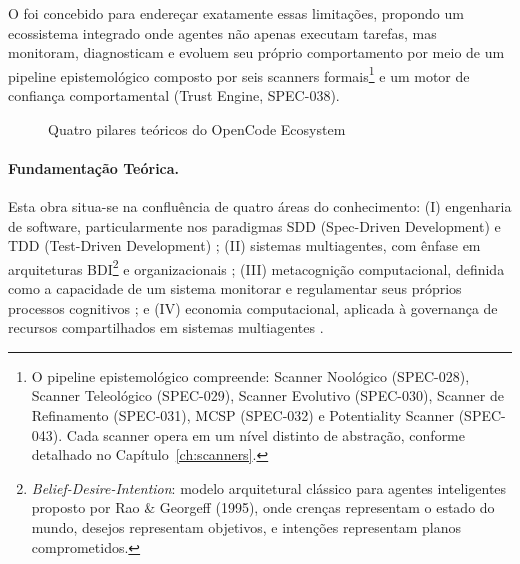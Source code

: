 O \opencodeeco{} foi concebido para endereçar exatamente essas limitações,
propondo um ecossistema integrado onde agentes não apenas executam
tarefas, mas monitoram, diagnosticam e evoluem seu próprio comportamento
por meio de um pipeline epistemológico composto por seis scanners
formais\footnote{O pipeline epistemológico compreende: Scanner Noológico
(SPEC-028), Scanner Teleológico (SPEC-029), Scanner Evolutivo (SPEC-030),
Scanner de Refinamento (SPEC-031), MCSP (SPEC-032) e Potentiality Scanner
(SPEC-043). Cada scanner opera em um nível distinto de abstração,
conforme detalhado no Capítulo~\ref{ch:scanners}.} e um motor de confiança
comportamental (Trust Engine, SPEC-038).

\begin{figure}[htb]
\centering
\caption{Quatro pilares teóricos do OpenCode Ecosystem}
\label{fig:quatro-pilares}
\end{figure}

\paragraph*{Fundamentação Teórica.}
Esta obra situa-se na confluência de quatro áreas do conhecimento:
(I) engenharia de software, particularmente nos paradigmas SDD
(Spec-Driven Development) e TDD (Test-Driven Development)
\cite{beck2003tdd}; (II) sistemas multiagentes, com ênfase em
arquiteturas BDI\footnote{\textit{Belief-Desire-Intention}: modelo
arquitetural clássico para agentes inteligentes proposto por
Rao \& Georgeff (1995), onde crenças representam o estado do mundo,
desejos representam objetivos, e intenções representam planos
comprometidos.} e organizacionais \cite{ferber1999multiagent};
(III) metacognição computacional, definida como a capacidade de um
sistema monitorar e regulamentar seus próprios processos cognitivos
\cite{flavell1976metacognitive, cox2011metacognitive}; e
(IV) economia computacional, aplicada à governança de recursos
compartilhados em sistemas multiagentes \cite{ostrom1990governing}.

